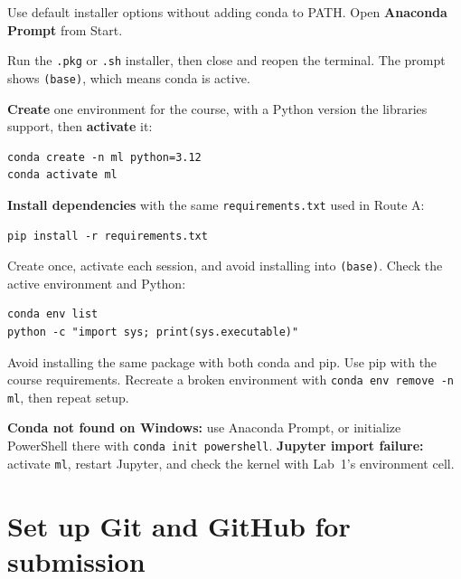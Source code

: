 \begin{description}[leftmargin=1.15in,style=nextline]
  \item[Windows] Use default installer options without adding conda to PATH. Open \textbf{Anaconda Prompt} from Start.
  \item[macOS / Linux] Run the \texttt{.pkg} or \texttt{.sh} installer, then close and reopen the terminal. The prompt shows \texttt{(base)}, which means conda is active.
\end{description}

\textbf{Create} one environment for the course, with a Python version the libraries support, then \textbf{activate} it:

\begin{lstlisting}[style=mlterminal]
conda create -n ml python=3.12
conda activate ml
\end{lstlisting}

\textbf{Install dependencies} with the same \texttt{requirements.txt} used in Route A:

\begin{lstlisting}[style=mlterminal]
pip install -r requirements.txt
\end{lstlisting}

Create once, activate each session, and avoid installing into \texttt{(base)}. Check the active environment and Python:

\begin{lstlisting}[style=mlterminal]
conda env list
python -c "import sys; print(sys.executable)"
\end{lstlisting}

\begin{pitfall}
Avoid installing the same package with both conda and pip. Use pip with the course requirements. Recreate a broken environment with \texttt{conda env remove -n ml}, then repeat setup.
\end{pitfall}

\begin{troubleshoot}
\textbf{Conda not found on Windows:} use Anaconda Prompt, or initialize PowerShell there with \texttt{conda init powershell}. \textbf{Jupyter import failure:} activate \texttt{ml}, restart Jupyter, and check the kernel with Lab~1's environment cell.
\end{troubleshoot}

\section{Set up Git and GitHub for submission}

